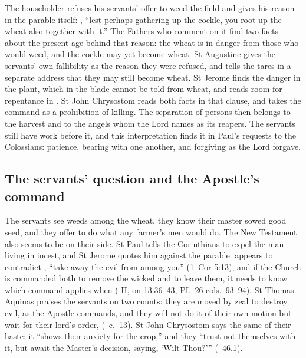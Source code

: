 
The householder refuses his servants' offer to weed the field and gives his
reason in the parable itself: , ``lest perhaps gathering up the cockle,
you root up the wheat also together with it.'' The Fathers who comment on it
find two facts about the present age behind that reason: the wheat is in
danger from those who would weed, and the cockle may yet become wheat. St
Augustine gives the servants' own fallibility as the reason they were
refused, and tells the tares in a separate address that they may still
become wheat. St Jerome finds the danger in the plant, which in the blade
cannot be told from wheat, and reads room for repentance in .
St John Chrysostom reads both facts in that clause, and takes the command as
a prohibition of killing. The separation of persons then belongs to the
harvest and to the angels whom the Lord names as its reapers. The servants
still have work before it, and this interpretation finds it in Paul's
requests to the Colossians: patience, bearing with one another, and forgiving
as the Lord forgave.

\subsection{The servants' question and the Apostle's command}
\label{sec:patience-question}

The servants see weeds among the wheat,
they know their master sowed good seed, and they offer to do what any farmer's
men would do. The New Testament also seems to be on their side. St Paul tells
the Corinthians to expel the man living in incest, and St Jerome quotes him
against the parable:  appears to contradict
, ``take away the evil from among
you'' (1~Cor 5:13), and if the Church is commanded both to remove the wicked
and to leave them, it needs to know which command applies when ( II, on 13:36--43, PL~26 cols.~93--94). St Thomas Aquinas praises
the servants on two counts: they are moved by zeal to destroy evil, as the
Apostle commands, and they will not do it of their own motion but wait for
their lord's order,  (\ c.~13). St John
Chrysostom says the same of their haste: it ``shows their anxiety for the
crop,'' and they ``trust not themselves with it, but await the Master's
decision, saying, `Wilt Thou?''' (\ 46.1).

